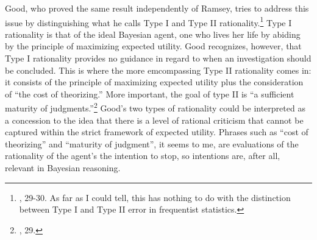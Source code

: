 Good, who proved the same result independently of Ramsey, tries to
address this issue by distinguishing what he calls Type I and Type II
rationality.\footnote{\cite{goodthinking}, 29-30. As far as I
  could tell, this has nothing to do with the distinction between Type I
  and Type II error in frequentist statistics.} Type I rationality is
that of the ideal Bayesian agent, one who lives her life by abiding by
the principle of maximizing expected utility. Good recognizes, however,
that Type I rationality provides no guidance in regard to when an
investigation should be concluded. This is where the more emcompassing Type II rationality
comes in: it consists of the principle of maximizing expected utility plus the
consideration of ``the cost of theorizing.'' More important, the goal of
type II is ``a sufficient maturity of judgments.''\footnote{\cite{goodthinking}, 29.} Good's two types of rationality could be interpreted as a concession to the idea that
there is a level of rational criticism that cannot be captured within
the strict framework of expected utility. Phrases such as ``cost of
theorizing'' and ``maturity of judgment'', it seems to me, are evaluations of the rationality of the agent's the intention to stop, so intentions are, after all,
relevant in Bayesian reasoning.  





 